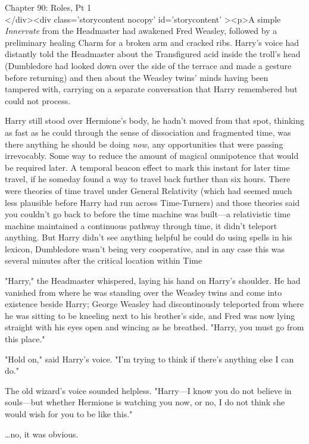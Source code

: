 
Chapter 90: Roles, Pt 1\\
</div><div  class='storycontent nocopy' id='storycontent' ><p>A simple 
\emph{Innervate} from the Headmaster had awakened Fred Weasley, followed by a 
preliminary healing Charm for a broken arm and cracked ribs. Harry's voice had 
distantly told the Headmaster about the Transfigured acid inside the troll's 
head (Dumbledore had looked down over the side of the terrace and made a 
gesture before returning) and then about the Weasley twins' minds having been 
tampered with, carrying on a separate conversation that Harry remembered but 
could not process.

Harry still stood over Hermione's body, he hadn't moved from that spot, 
thinking as fast as he could through the sense of dissociation and fragmented 
time, was there anything he should be doing \emph{now,} any opportunities that 
were passing irrevocably. Some way to reduce the amount of magical omnipotence 
that would be required later. A temporal beacon effect to mark this instant for 
later time travel, if he someday found a way to travel back further than six 
hours. There were theories of time travel under General Relativity (which had 
seemed much less plausible before Harry had run across Time-Turners) and those 
theories said you couldn't go back to before the time machine was built---a 
relativistic time machine maintained a continuous pathway through time, it 
didn't teleport anything. But Harry didn't see anything helpful he could do 
using spells in his lexicon, Dumbledore wasn't being very cooperative, and in 
any case this was several minutes after the critical location within Time

"Harry," the Headmaster whispered, laying his hand on Harry's shoulder. He had 
vanished from where he was standing over the Weasley twins and come into 
existence beside Harry; George Weasley had discontinously teleported from where 
he was sitting to be kneeling next to his brother's side, and Fred was now 
lying straight with his eyes open and wincing as he breathed. "Harry, you must 
go from this place."

"Hold on," said Harry's voice. "I'm trying to think if there's anything else I 
can do."

The old wizard's voice sounded helpless. "Harry---I know you do not believe in 
souls---but whether Hermione is watching you now, or no, I do not think she 
would wish for you to be like this."

{\ldots}no, it was obvious.

